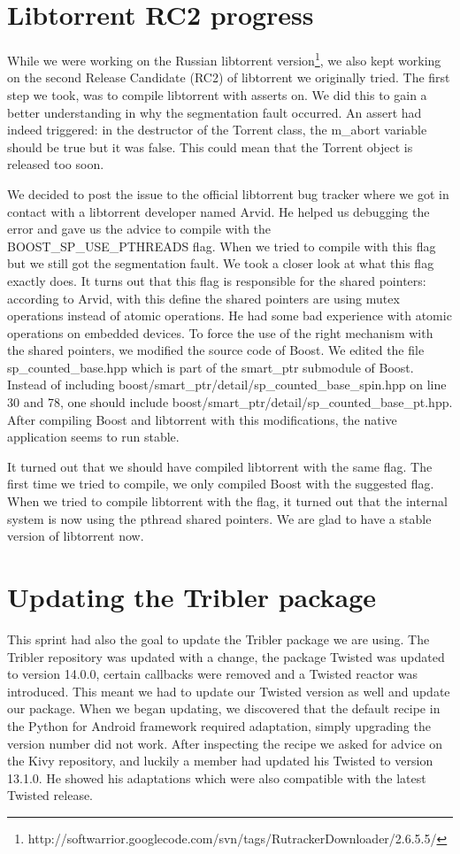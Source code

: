 	\section{Libtorrent RC2 progress}
		While we were working on the Russian libtorrent version\footnote{http://softwarrior.googlecode.com/svn/tags/RutrackerDownloader/2.6.5.5/}, we also kept working on the second Release Candidate (RC2) of libtorrent we originally tried. The first step we took, was to compile libtorrent with asserts on. We did this to gain a better understanding in why the segmentation fault occurred. An assert had indeed triggered: in the destructor of the Torrent class, the m\_abort variable should be true but it was false. This could mean that the Torrent object is released too soon.
		
		We decided to post the issue to the official libtorrent bug tracker where we got in contact with a libtorrent developer named Arvid. He helped us debugging the error and gave us the advice to compile with the BOOST\_SP\_USE\_PTHREADS flag. When we tried to compile with this flag but we still got the segmentation fault. We took a closer look at what this flag exactly does. It turns out that this flag is responsible for the shared pointers: according to Arvid, with this define the shared pointers are using mutex operations instead of atomic operations. He had some bad experience with atomic operations on embedded devices. To force the use of the right mechanism with the shared pointers, we modified the source code of Boost. We edited the file sp\_counted\_base.hpp which is part of the smart\_ptr submodule of Boost. Instead of including boost/smart\_ptr/detail/sp\_counted\_base\_spin.hpp on line 30 and 78, one should include boost/smart\_ptr/detail/sp\_counted\_base\_pt.hpp. After compiling Boost and libtorrent with this modifications, the native application seems to run stable.
		
		It turned out that we should have compiled libtorrent with the same flag. The first time we tried to compile, we only compiled Boost with the suggested flag. When we tried to compile libtorrent with the flag, it turned out that the internal system is now using the pthread shared pointers. We are glad to have a stable version of libtorrent now.
				
	\section{Updating the Tribler package}
		This sprint had also the goal to update the Tribler package we are using. The Tribler repository was updated with a change, the package Twisted was updated to version 14.0.0, certain callbacks were removed and a Twisted reactor was introduced. This meant we had to update our Twisted version as well and update our package.
		When we began updating, we discovered that the default recipe in the Python for Android framework required adaptation, simply upgrading the version number did not work. After inspecting the recipe we asked for advice on the Kivy repository, and luckily a member had updated his Twisted to version 13.1.0. He showed his adaptations which were also compatible with the latest Twisted release.
		
